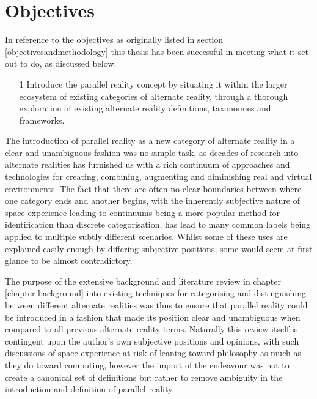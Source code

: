 
\section{Objectives}

In reference to the objectives as originally listed in section \ref{objectivesandmethodology} this thesis has been successful in meeting what it set out to do, as discussed below.

\begin{enumerate}
	\item[1] Introduce the parallel reality concept by situating it within the larger ecosystem of existing categories of alternate reality, through a thorough exploration of existing alternate reality definitions, taxonomies and frameworks.
\end{enumerate}

The introduction of parallel reality as a new category of alternate reality in a clear and unambiguous fashion was no simple task, as decades of research into alternate realities has furnished us with a rich continuum of approaches and technologies for creating, combining, augmenting and diminishing real and virtual environments. The fact that there are often no clear boundaries between where one category ends and another begins, with the inherently subjective nature of space experience leading to continuums being a more popular method for identification than discrete categorisation, has lead to many common labels being applied to multiple subtly different scenarios. Whilst some of these uses are explained easily enough by differing subjective positions, some would seem at first glance to be almost contradictory.

The purpose of the extensive background and literature review in chapter \ref{chapter-background} into existing techniques for categorising and distinguishing between different alternate realities was thus to ensure that parallel reality could be introduced in a fashion that made its position clear and unambiguous when compared to all previous alternate reality terms. Naturally this review itself is contingent upon the author's own subjective positions and opinions, with such discussions of space experience at risk of leaning toward philosophy as much as they do toward computing, however the import of the endeavour was not to create a canonical set of definitions but rather to remove ambiguity in the introduction and definition of parallel reality.

